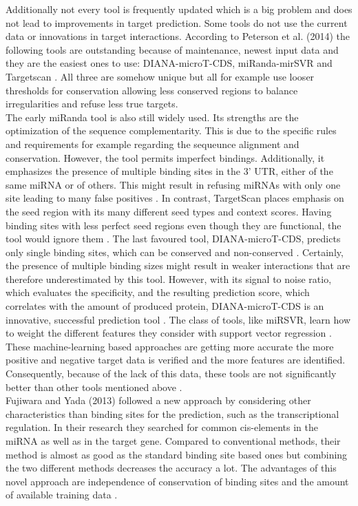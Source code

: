 \documentclass[11pt, a4paper, twoside]{book}
\begin{document}
Additionally not every tool is frequently updated which is a big problem and does not lead to improvements in target prediction. Some tools do not use the current data or innovations in target interactions. According to Peterson et al. (2014) the following tools are outstanding because of maintenance, newest input data and they are the easiest ones to use: DIANA-microT-CDS, miRanda-mirSVR and Targetscan \cite{Peterson}. All three are somehow unique but all for example use looser thresholds for conservation allowing less conserved regions to balance irregularities and refuse less true targets.\\

The early miRanda tool is also still widely used. Its strengths are the optimization of the sequence complementarity. This is due to the specific rules and requirements for example regarding the sequeunce alignment and conservation. However, the tool permits imperfect bindings. Additionally, it emphasizes the presence of multiple binding sites in the 3' UTR, either of the same miRNA or of others. This might result in refusing miRNAs with only one site leading to many false positives \cite{John}. In contrast, TargetScan places emphasis on the seed region with its many different seed types and context scores. Having binding sites with less perfect seed regions even though they are functional, the tool would ignore them \cite{Lewis}. The last favoured tool, DIANA-microT-CDS, predicts only single binding sites, which can be conserved and non-conserved \cite{Kiriakidou}. Certainly, the presence of multiple binding sizes might result in weaker interactions that are therefore underestimated by this tool. However, with its signal to noise ratio, which evaluates the specificity, and the resulting prediction score, which correlates with the amount of produced protein, DIANA-microT-CDS is an innovative, successful prediction tool \cite{Maragkakis}. The class of tools, like miRSVR, learn how to weight the different features they consider with support vector regression \cite{Betel}. These machine-learning based approaches are getting more accurate the more positive and negative target data is verified and the more features are identified. Consequently, because of the lack of this data, these tools are not significantly better than other tools mentioned above \cite{Peterson}. \\

Fujiwara and Yada (2013) followed a new approach by considering other characteristics than binding sites for the prediction, such as the transcriptional regulation. In their research they searched for common cis-elements in the miRNA as well as in the target gene. Compared to conventional methods, their method is almost as good as the standard binding site based ones but combining the two different methods decreases the accuracy a lot. The advantages of this novel approach are independence of conservation of binding sites and the amount of available training data \cite{Fuji}. \\
\end{document}
